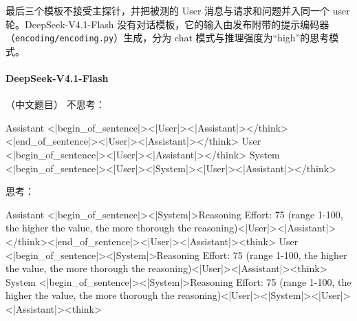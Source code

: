 最后三个模板不接受主探针，并把被测的 User 消息与请求和问题并入同一个 user 轮。DeepSeek-V4.1-Flash 没有对话模板，它的输入由发布附带的提示编码器（\texttt{encoding/\allowbreak encoding.py}）生成，分为 chat 模式与推理强度为“high”的思考模式。

\paragraph{DeepSeek-V4.1-Flash} （中文题目）
\noindent 不思考：
\begin{Rendering}
Assistant  <|begin_of_sentence|><|User|><|Assistant|></think><|end_of_sentence|><|User|><|Assistant|></think>
User       <|begin_of_sentence|><|User|>\NL{}\NL{}\NL{}\NL{}<|Assistant|></think>
System     <|begin_of_sentence|><|User|><|System|><|User|><|Assistant|></think>
\end{Rendering}
\noindent 思考：
\begin{Rendering}
Assistant  <|begin_of_sentence|><|System|>Reasoning Effort: 75 (range 1-100, the higher the value, the more thorough the reasoning)\NL{}\NL{}<|User|><|Assistant|></think><|end_of_sentence|><|User|><|Assistant|><think>
User       <|begin_of_sentence|><|System|>Reasoning Effort: 75 (range 1-100, the higher the value, the more thorough the reasoning)\NL{}\NL{}<|User|>\NL{}\NL{}\NL{}\NL{}<|Assistant|><think>
System     <|begin_of_sentence|><|System|>Reasoning Effort: 75 (range 1-100, the higher the value, the more thorough the reasoning)\NL{}\NL{}<|User|><|System|><|User|><|Assistant|><think>
\end{Rendering}
